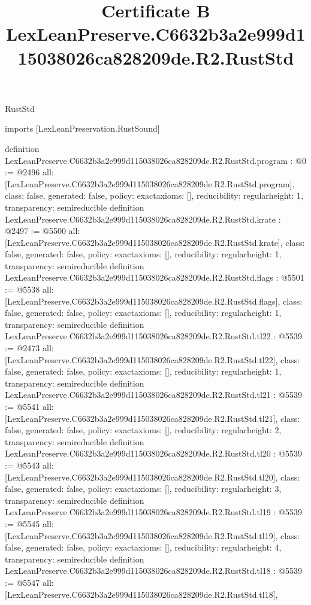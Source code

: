 \begin{lexlean}{RustStd}
\title{Certificate B LexLeanPreserve.C6632b3a2e999d115038026ca828209de.R2.RustStd}
\begin{coremodule}
imports [LexLeanPreservation.RustSound]

definition LexLeanPreserve.C6632b3a2e999d115038026ca828209de.R2.RustStd.program : @0 := @2496 {
  all: [LexLeanPreserve.C6632b3a2e999d115038026ca828209de.R2.RustStd.program],
  class: false,
  generated: false,
  policy: exact{axioms: []},
  reducibility: regular{height: 1},
  transparency: semireducible
}
definition LexLeanPreserve.C6632b3a2e999d115038026ca828209de.R2.RustStd.krate : @2497 := @5500 {
  all: [LexLeanPreserve.C6632b3a2e999d115038026ca828209de.R2.RustStd.krate],
  class: false,
  generated: false,
  policy: exact{axioms: []},
  reducibility: regular{height: 1},
  transparency: semireducible
}
definition LexLeanPreserve.C6632b3a2e999d115038026ca828209de.R2.RustStd.flags : @5501 := @5538 {
  all: [LexLeanPreserve.C6632b3a2e999d115038026ca828209de.R2.RustStd.flags],
  class: false,
  generated: false,
  policy: exact{axioms: []},
  reducibility: regular{height: 1},
  transparency: semireducible
}
definition LexLeanPreserve.C6632b3a2e999d115038026ca828209de.R2.RustStd.tl22 : @5539 := @2473 {
  all: [LexLeanPreserve.C6632b3a2e999d115038026ca828209de.R2.RustStd.tl22],
  class: false,
  generated: false,
  policy: exact{axioms: []},
  reducibility: regular{height: 1},
  transparency: semireducible
}
definition LexLeanPreserve.C6632b3a2e999d115038026ca828209de.R2.RustStd.tl21 : @5539 := @5541 {
  all: [LexLeanPreserve.C6632b3a2e999d115038026ca828209de.R2.RustStd.tl21],
  class: false,
  generated: false,
  policy: exact{axioms: []},
  reducibility: regular{height: 2},
  transparency: semireducible
}
definition LexLeanPreserve.C6632b3a2e999d115038026ca828209de.R2.RustStd.tl20 : @5539 := @5543 {
  all: [LexLeanPreserve.C6632b3a2e999d115038026ca828209de.R2.RustStd.tl20],
  class: false,
  generated: false,
  policy: exact{axioms: []},
  reducibility: regular{height: 3},
  transparency: semireducible
}
definition LexLeanPreserve.C6632b3a2e999d115038026ca828209de.R2.RustStd.tl19 : @5539 := @5545 {
  all: [LexLeanPreserve.C6632b3a2e999d115038026ca828209de.R2.RustStd.tl19],
  class: false,
  generated: false,
  policy: exact{axioms: []},
  reducibility: regular{height: 4},
  transparency: semireducible
}
definition LexLeanPreserve.C6632b3a2e999d115038026ca828209de.R2.RustStd.tl18 : @5539 := @5547 {
  all: [LexLeanPreserve.C6632b3a2e999d115038026ca828209de.R2.RustStd.tl18],
}
\end{coremodule}
\end{lexlean}
